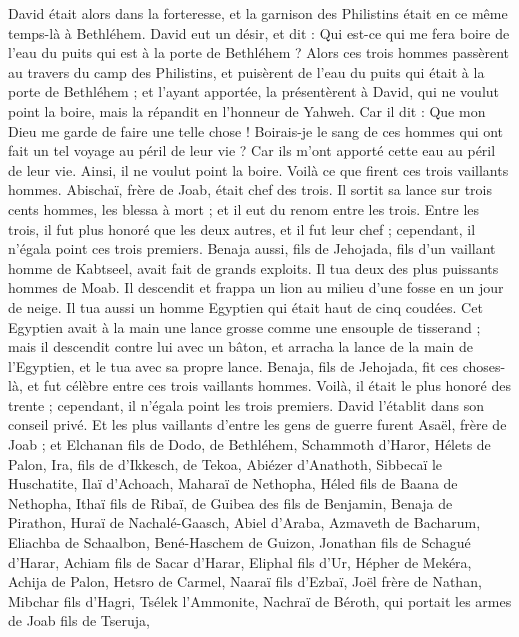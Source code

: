 \begin{multicols}{2}
David était alors dans la forteresse, et la garnison des Philistins était en ce même temps-là à Bethléhem.
David eut un désir, et dit : Qui est-ce qui me fera boire de l'eau du puits qui est à la porte de Bethléhem ?
Alors ces trois hommes passèrent au travers du camp des Philistins, et puisèrent de l'eau du puits qui était à la porte de Bethléhem ; et l'ayant apportée, la présentèrent à David, qui ne voulut point la boire, mais la répandit en l'honneur de Yahweh.
Car il dit : Que mon Dieu me garde de faire une telle chose ! Boirais-je le sang de ces hommes qui ont fait un tel voyage au péril de leur vie ? Car ils m'ont apporté cette eau au péril de leur vie. Ainsi, il ne voulut point la boire. Voilà ce que firent ces trois vaillants hommes.
Abischaï, frère de Joab, était chef des trois. Il sortit sa lance sur trois cents hommes, les blessa à mort ; et il eut du renom entre les trois.
Entre les trois, il fut plus honoré que les deux autres, et il fut leur chef ; cependant, il n'égala point ces trois premiers.
Benaja aussi, fils de Jehojada, fils d'un vaillant homme de Kabtseel, avait fait de grands exploits. Il tua deux des plus puissants hommes de Moab. Il descendit et frappa un lion au milieu d'une fosse en un jour de neige.
Il tua aussi un homme Egyptien qui était haut de cinq coudées. Cet Egyptien avait à la main une lance grosse comme une ensouple de tisserand ; mais il descendit contre lui avec un bâton, et arracha la lance de la main de l'Egyptien, et le tua avec sa propre lance.
Benaja, fils de Jehojada, fit ces choses-là, et fut célèbre entre ces trois vaillants hommes.
Voilà, il était le plus honoré des trente ; cependant, il n'égala point les trois premiers. David l'établit dans son conseil privé.
Et les plus vaillants d'entre les gens de guerre furent Asaël, frère de Joab ; et Elchanan fils de Dodo, de Bethléhem,
Schammoth d'Haror, Hélets de Palon,
Ira, fils de d'Ikkesch, de Tekoa, Abiézer d'Anathoth,
Sibbecaï le Huschatite, Ilaï d'Achoach,
Maharaï de Nethopha, Héled fils de Baana de Nethopha,
Ithaï fils de Ribaï, de Guibea des fils de Benjamin, Benaja de Pirathon,
Huraï de Nachalé-Gaasch, Abiel d'Araba,
Azmaveth de Bacharum, Eliachba de Schaalbon,
Bené-Haschem de Guizon, Jonathan fils de Schagué d'Harar,
Achiam fils de Sacar d'Harar, Eliphal fils d'Ur,
Hépher de Mekéra, Achija de Palon,
Hetsro de Carmel, Naaraï fils d'Ezbaï,
Joël frère de Nathan, Mibchar fils d'Hagri,
Tsélek l'Ammonite, Nachraï de Béroth, qui portait les armes de Joab fils de Tseruja,

\end{multicols}
